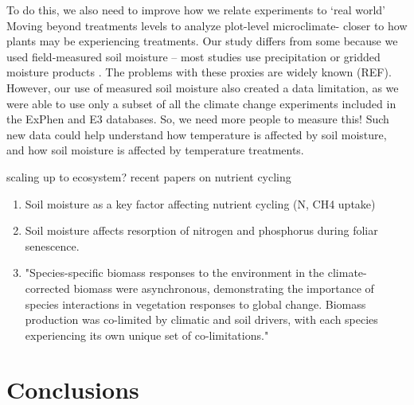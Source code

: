 \documentclass{article}
\begin{document}
 To do this, we also need to improve how we relate experiments to `real world'
 Moving beyond treatments levels to analyze plot-level microclimate- closer to how plants may be experiencing treatments. Our study differs from some because we used field-measured soil moisture -- most studies use precipitation \citep[e.g.,][]{tao2020} or gridded moisture products \citep[e.g.,][]{tao2019}. The problems with these proxies are widely known (REF). However, our use of measured soil moisture also created a data limitation, as we were able to use only a subset of all the climate change experiments included in the ExPhen and E3 databases. So, we need more people to measure this! Such new data could help understand how temperature is affected by soil moisture, and how soil moisture is affected by temperature treatments.
\par scaling up to ecosystem? recent papers on nutrient cycling
\begin{enumerate}
\item Soil moisture as a key factor affecting nutrient cycling (N, CH4 uptake)\citep{liu2019soil}
\item Soil moisture affects resorption of nitrogen and phosphorus during foliar senescence\citep{estiarte2022}.
\item "Species-specific biomass responses to the environment in the climate-corrected biomass were asynchronous, demonstrating the importance of species interactions in vegetation responses to global change. Biomass production was co-limited by climatic and soil drivers, with each species experiencing its own unique set of co-limitations." \citep{wilfahrt2021}
\end{enumerate}
\section* {Conclusions}
\end{document}
